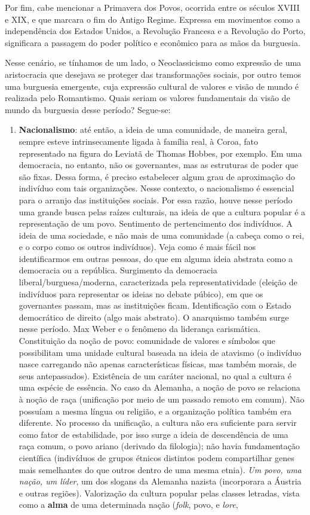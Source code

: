 Por fim, cabe mencionar a Primavera dos Povos, ocorrida entre os séculos XVIII e XIX, e que marcara o fim do Antigo Regime. Expressa em movimentos como a independência dos Estados Unidos, a Revolução Francesa e a Revolução do Porto, significara a passagem do poder político e econômico para as mãos da burguesia.

Nesse cenário, se tínhamos de um lado, o Neoclassicismo como expressão de uma aristocracia que desejava se proteger das transformações sociais, por outro temos uma burguesia emergente, cuja expressão cultural de valores e visão de mundo é realizada pelo Romantismo. Quais seriam os valores fundamentais da visão de mundo da burguesia desse período? Segue-se:

\begin{enumerate}
\item \textbf{Nacionalismo}: até então, a ideia de uma comunidade, de maneira geral, sempre esteve intrinsecamente ligada à família real, à Coroa, fato representado na figura do Leviatã de Thomas Hobbes, por exemplo. Em uma democracia, no entanto, não os governantes, mas as estruturas de poder que são fixas. Dessa forma, é preciso estabelecer algum grau de aproximação do indivíduo com tais organizações. Nesse contexto, o nacionalismo é essencial para o arranjo das instituições sociais. Por essa razão, houve nesse período uma grande busca pelas raízes culturais, na ideia de que a cultura popular é a representação de um povo. Sentimento de pertencimento dos indivíduos. A ideia de uma sociedade, e não mais de uma comunidade (a cabeça como o rei, e o corpo como os outros indivíduos). Veja como é mais fácil nos identificarmos em outras pessoas, do que em alguma ideia abstrata como a democracia ou a república. Surgimento da democracia liberal/burguesa/moderna, caracterizada pela representatividade (eleição de indivíduos para representar os ideias no debate púbico), em que os governantes passam, mas as instituições ficam. Identificação com o Estado democrático de direito (algo mais abstrato). O anarquismo também surge nesse período. Max Weber e o fenômeno da liderança carismática. Constituição da noção de povo: comunidade de valores e símbolos que possibilitam uma unidade cultural baseada na ideia de atavismo (o indivíduo nasce carregando não apenas características físicas, mas também morais, de seus antepassados). Existência de um caráter nacional, no qual a cultura é uma espécie de essência. No caso da Alemanha, a noção de povo se relaciona à noção de raça (unificação por meio de um passado remoto em comum). Não possuíam a mesma língua ou religião, e a organização política também era diferente. No processo da unificação, a cultura não era suficiente para servir como fator de estabilidade, por isso surge a ideia de descendência de uma raça comum, o povo ariano (derivado da filologia); não havia fundamentação científica (indivíduos de grupos étnicos distintos podem compartilhar genes mais semelhantes do que outros dentro de uma mesma etnia). \textit{Um povo, uma nação, um líder}, um dos slogans da Alemanha nazista (incorporara a Áustria e outras regiões). Valorização da cultura popular pelas classes letradas, vista como a \textbf{alma} de uma determinada nação (\textit{folk}, povo, e \textit{lore}, 
\end{enumerate}
